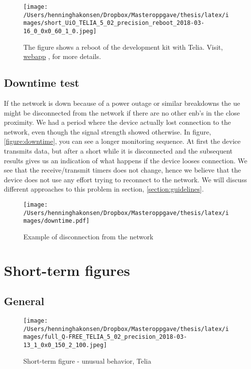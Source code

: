 \documentclass[USenglish]{ifimaster}  %
\begin{document}
\begin{figure}[H]
  \centering
  \texttt{[image: /Users/henninghakonsen/Dropbox/Masteroppgave/thesis/latex/images/short\_UiO\_TELIA\_5\_02\_precision\_reboot\_2018-03-16\_0\_0x0\_60\_1\_0.jpeg]}
  \caption[Short-term test - device reboot, Telia]{The figure shows a reboot of the development kit with Telia. Visit, \href{http://158.39.77.97:9000/\#/results/UiO\_TELIA\_5.02\_precision\_reboot\_2018-03-16\_0\_0x0\_60\_1\_0}{webapp} \cite{online:result10}, for more details.}
  \label{figure:telia_reboot}
\end{figure}

\subsection{Downtime test} \label{ssection:downtimetest}
If the network is down because of a power outage or similar breakdowns the \acrshort{ue} might be disconnected from the network if there are no other \acrshort{enb}'s in the close proximity. We had a period where the device actually lost connection to the network, even though the signal strength showed otherwise. In figure, \vref{figure:downtime}, you can see a longer monitoring sequence. At first the device transmits data, but after a short while it is disconnected and the subsequent results gives us an indication of what happens if the device looses connection. We see that the receive/transmit timers does not change, hence we believe that the device does not use any effort trying to reconnect to the network. We will discuss different approaches to this problem in section, \vref{section:guidelines}.

\begin{figure}[H]
  \centering
  \texttt{[image: /Users/henninghakonsen/Dropbox/Masteroppgave/thesis/latex/images/downtime.pdf]}
  \caption[Short-term test - downtime]{Example of disconnection from the network}
  \label{figure:downtime}
\end{figure}

\cleardoublepage
\section{Short-term figures}
\subsection{General} \label{ssection:general}
\begin{figure}[H]
  \centering
  \texttt{[image: /Users/henninghakonsen/Dropbox/Masteroppgave/thesis/latex/images/full\_Q-FREE\_TELIA\_5\_02\_precision\_2018-03-13\_1\_0x0\_150\_2\_100.jpeg]}
  \caption{Short-term figure - unusual behavior, Telia}
  \label{figure:2x150_QFREE_TELIA}
\end{figure}
\end{document}
